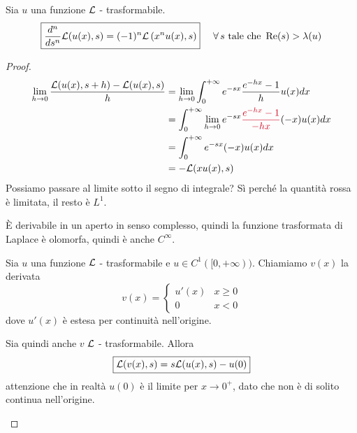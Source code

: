 \begin{thm}
Sia $u$ una funzione $\mathcal{L}$ - trasformabile.
\begin{equation*}
\boxed{\frac{d^{n}}{ds^{n}}\Lc(u(x), s) = (- 1)^{n} \Lc\left(x^{n} u(x), s\right)} \ \ \ \ \forall s\ \text{tale che} \ \Re (s) > \lambda (u)
\end{equation*}
\end{thm}
\begin{proof}
\begin{align*}
\lim\limits_{h\rightarrow 0}\frac{\Lc(u(x), s + h) - \Lc(u(x), s)}{h} & = \lim\limits_{h\rightarrow 0}\int^{+ \infty}_{0} e^{- sx}\frac{e^{- hx} - 1}{h} u(x) dx\\
 & = \int^{+ \infty}_{0}\lim\limits_{h\rightarrow 0} e^{- sx}\textcolor[rgb]{0.82, 0.01, 0.11}{\frac{e^{- hx} - 1}{- hx}}(- x) u(x) dx\\
 & = \int^{+ \infty}_{0} e^{- sx}(- x) u(x) dx\\
 & = - \Lc(xu(x), s)
\end{align*}
Possiamo passare al limite sotto il segno di integrale? Sì perché la quantità rossa è limitata, il resto è $L^{1}$.

È derivabile in un aperto in senso complesso, quindi la funzione trasformata di Laplace è olomorfa, quindi è anche $C^{\infty}$.
\begin{thm}
Sia $u$ una funzione $\mathcal{L}$ - trasformabile e $u\in C^{1}([0, + \infty))$. Chiamiamo $v(x)$ la derivata
\begin{equation*}
v(x) =
\begin{cases}
u'(x) & x \geq 0\\
0 & x < 0
\end{cases}
\end{equation*}
dove $u'(x)$ è estesa per continuità nell'origine.

Sia quindi anche $v$ $\mathcal{L}$ - trasformabile. Allora
\begin{equation*}
\boxed{\mathcal{L}(v(x), s) = s\mathcal{L}(u(x), s) - u(0)}
\end{equation*}
attenzione che in realtà $u(0)$ è il limite per $x\rightarrow 0^{+}$, dato che non è di solito continua nell'origine.


\end{thm}
\end{proof}
